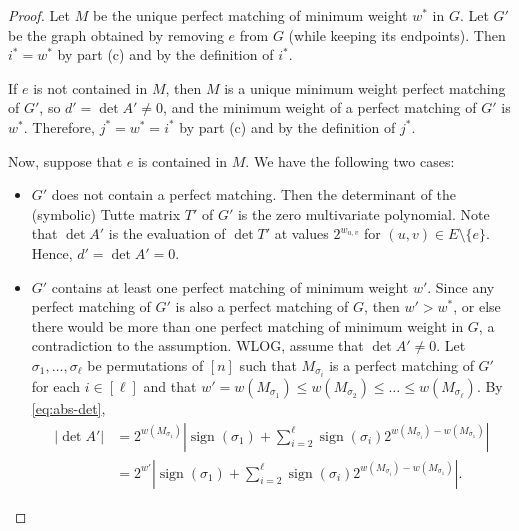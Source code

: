 \documentclass[letterpaper, reqno,11pt]{article}
\DeclareMathOperator{\sign}{sign}
\begin{document}
\begin{enumerate}
\begin{enumerate}
    \begin{proof}
      Let $M$ be the unique perfect matching of minimum weight $w^*$ in $G$. Let $G'$ be the graph obtained by removing $e$ from $G$ (while keeping its endpoints). Then $i^* = w^*$ by part (c) and by the definition of $i^*$.

      If $e$ is not contained in $M$, then $M$ is a unique minimum weight perfect matching of $G'$, so $d' = \det A' \neq 0$, and the minimum weight of a perfect matching of $G'$ is $w^*$. Therefore, $j^* = w^* = i^*$ by part (c) and by the definition of $j^*$.

      Now, suppose that $e$ is contained in $M$. We have the following two cases:
      \begin{itemize}[itemsep=0pt]
        \item $G'$ does not contain a perfect matching. Then the determinant of the (symbolic) Tutte matrix $T'$ of $G'$ is the zero multivariate polynomial. Note that $\det A'$ is the evaluation of $\det T'$ at values $2^{w_{u, v}}$ for $(u, v) \in E \setminus \{ e \}$. Hence, $d' = \det A' = 0$.
        \item $G'$ contains at least one perfect matching of minimum weight $w'$. Since any perfect matching of $G'$ is also a perfect matching of $G$, then $w' > w^*$, or else there would be more than one perfect matching of minimum weight in $G$, a contradiction to the assumption. WLOG, assume that $\det A' \neq 0$. Let $\sigma_1, \ldots, \sigma_\ell$ be permutations of $[n]$ such that $M_{\sigma_i}$ is a perfect matching of $G'$ for each $i \in [\ell]$ and that $w' = w(M_{\sigma_1}) \leq w(M_{\sigma_2}) \leq \ldots \leq w(M_{\sigma_\ell})$. By \eqref{eq:abs-det},
        \begin{align*}
          \left|\det A'\right| &= 2^{w\left(M_{\sigma_1}\right)} \left|\sign\left(\sigma_1\right) + \sum_{i = 2}^\ell \sign\left(\sigma_i\right) 2^{w\left(M_{\sigma_i}\right) - w\left(M_{\sigma_1}\right)}\right| \\
          &= 2^{w'} \left|\sign\left(\sigma_1\right) + \sum_{i = 2}^\ell \sign\left(\sigma_i\right) 2^{w\left(M_{\sigma_i}\right) - w\left(M_{\sigma_1}\right)}\right|.

\end{align*}
\end{itemize}
\end{proof}
\end{enumerate}
\end{enumerate}
\end{document}
